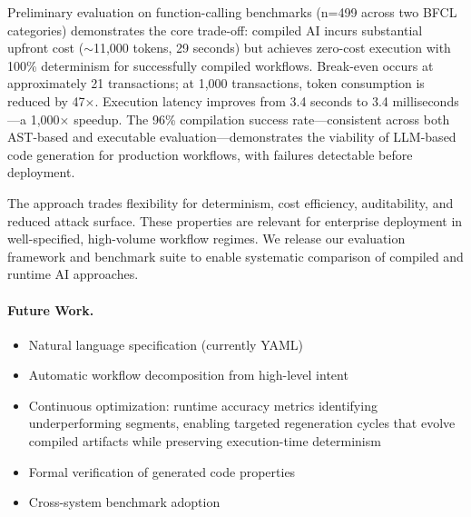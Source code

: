 \documentclass[11pt]{article}
\begin{document}
Preliminary evaluation on function-calling benchmarks (n=499 across two BFCL categories) demonstrates the core trade-off: compiled AI incurs substantial upfront cost ($\sim$11,000 tokens, 29 seconds) but achieves zero-cost execution with 100\% determinism for successfully compiled workflows. Break-even occurs at approximately 21 transactions; at 1,000 transactions, token consumption is reduced by 47$\times$. Execution latency improves from 3.4 seconds to 3.4 milliseconds---a 1,000$\times$ speedup. The 96\% compilation success rate---consistent across both AST-based and executable evaluation---demonstrates the viability of LLM-based code generation for production workflows, with failures detectable before deployment.

The approach trades flexibility for determinism, cost efficiency, auditability, and reduced attack surface. These properties are relevant for enterprise deployment in well-specified, high-volume workflow regimes. We release our evaluation framework and benchmark suite to enable systematic comparison of compiled and runtime AI approaches.

\paragraph{Future Work.}
\begin{itemize}
    \item Natural language specification (currently YAML)
    \item Automatic workflow decomposition from high-level intent
    \item Continuous optimization: runtime accuracy metrics identifying underperforming segments, enabling targeted regeneration cycles that evolve compiled artifacts while preserving execution-time determinism
    \item Formal verification of generated code properties
    \item Cross-system benchmark adoption
\end{itemize}



\end{document}
